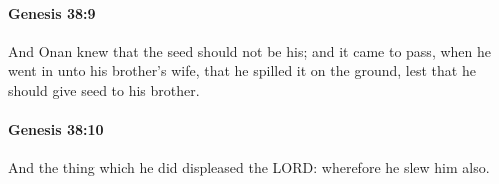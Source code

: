 		\paragraph{Genesis 38:9} %
			\label{GENESIS-38-9}

			And Onan knew that the seed should not be his; and it came to pass, when he went in unto his brother's wife, that he spilled it on the ground, lest that he should give seed to his brother.


		\paragraph{Genesis 38:10} %
			\label{GENESIS-38-10}

			And the thing which he did displeased the LORD: wherefore he slew him also.


